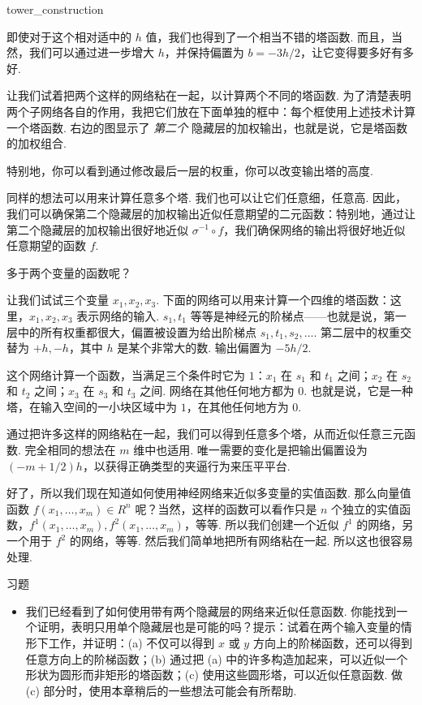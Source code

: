 \begin{movieNote}{tower\_\allowbreak{}construction}
\end{movieNote}

\noindent 即使对于这个相对适中的 $h$ 值，我们也得到了一个相当不错的塔函数. 而且，当然，我们可以通过进一步增大 $h$，并保持偏置为 $b = -3h/2$，让它变得要多好有多好.

让我们试着把两个这样的网络粘在一起，以计算两个不同的塔函数. 为了清楚表明两个子网络各自的作用，我把它们放在下面单独的框中：每个框使用上述技术计算一个塔函数. 右边的图显示了 \emph{第二个} 隐藏层的加权输出，也就是说，它是塔函数的加权组合.

特别地，你可以看到通过修改最后一层的权重，你可以改变输出塔的高度.

同样的想法可以用来计算任意多个塔. 我们也可以让它们任意细，任意高. 因此，我们可以确保第二个隐藏层的加权输出近似任意期望的二元函数：特别地，通过让第二个隐藏层的加权输出很好地近似 $\sigma^{-1} \circ f$，我们确保网络的输出将很好地近似任意期望的函数 $f$.

多于两个变量的函数呢？

让我们试试三个变量 $x_1, x_2, x_3$. 下面的网络可以用来计算一个四维的塔函数：这里，$x_1, x_2, x_3$ 表示网络的输入. $s_1, t_1$ 等等是神经元的阶梯点——也就是说，第一层中的所有权重都很大，偏置被设置为给出阶梯点 $s_1, t_1, s_2, \ldots$. 第二层中的权重交替为 $+h, -h$，其中 $h$ 是某个非常大的数. 输出偏置为 $-5h/2$.

这个网络计算一个函数，当满足三个条件时它为 $1$：$x_1$ 在 $s_1$ 和 $t_1$ 之间；$x_2$ 在 $s_2$ 和 $t_2$ 之间；$x_3$ 在 $s_3$ 和 $t_3$ 之间. 网络在其他任何地方都为 $0$. 也就是说，它是一种塔，在输入空间的一小块区域中为 $1$，在其他任何地方为 $0$.

通过把许多这样的网络粘在一起，我们可以得到任意多个塔，从而近似任意三元函数. 完全相同的想法在 $m$ 维中也适用. 唯一需要的变化是把输出偏置设为 $(-m+1/2)h$，以获得正确类型的夹逼行为来压平平台.

好了，所以我们现在知道如何使用神经网络来近似多变量的实值函数. 那么向量值函数 $f(x_1, \ldots, x_m) \in R^n$ 呢？当然，这样的函数可以看作只是 $n$ 个独立的实值函数，$f^1(x_1, \ldots, x_m), f^2(x_1, \ldots, x_m)$，等等. 所以我们创建一个近似 $f^1$ 的网络，另一个用于 $f^2$ 的网络，等等. 然后我们简单地把所有网络粘在一起. 所以这也很容易处理.

\begin{exerciseBox}{习题}

\begin{itemize}

\item 我们已经看到了如何使用带有两个隐藏层的网络来近似任意函数. 你能找到一个证明，表明只用单个隐藏层也是可能的吗？提示：试着在两个输入变量的情形下工作，并证明：(a) 不仅可以得到 $x$ 或 $y$ 方向上的阶梯函数，还可以得到任意方向上的阶梯函数；(b) 通过把 (a) 中的许多构造加起来，可以近似一个形状为圆形而非矩形的塔函数；(c) 使用这些圆形塔，可以近似任意函数. 做 (c) 部分时，使用本章稍后的一些想法可能会有所帮助.

\end{itemize}

\end{exerciseBox}

